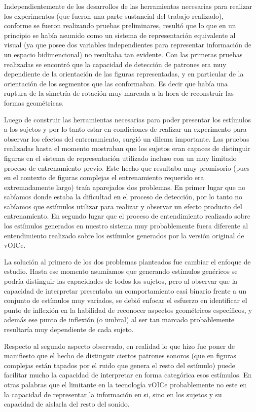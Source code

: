 \documentclass{article}
\numberwithin{figure}{section}
\begin{document}
    Independientemente de los desarrollos de las herramientas necesarias para realizar los experimentos (que fueron una parte sustancial del trabajo realizado), conforme se fueron realizando pruebas preliminares, resultó que lo que en un principio se había asumido como un sistema de representación equivalente al visual (ya que posee dos variables independientes para representar información de un espacio bidimencional) no resultaba tan evidente. Con las primeras pruebas realizadas se encontró que la capacidad de detección de patrones era muy dependiente de la orientación de las figuras representadas, y en particular de la orientación de los segmentos que las conformaban. Es decir que había una ruptura de la simetría de rotación muy marcada a la hora de reconstruir las formas geométricas.
    
    Luego de construir las herramientas necesarias para poder presentar los estímulos a los sujetos y por lo tanto estar en condiciones de realizar un experimento para observar los efectos del entrenamiento, surgió un dilema importante. Las pruebas realizadas hasta el momento mostraban que los sujetos eran capaces de distinguir figuras en el sistema de representación utilizado incluso con un muy limitado proceso de entrenamiento previo. Este hecho que resultaba muy promisorio (pues en el contexto de figuras complejas el entrenamiento requerido era extremadamente largo) traía aparejados dos problemas. En primer lugar que no sabíamos donde estaba la dificultad en el proceso de detección, por lo tanto no sabíamos que estímulos utilizar para realizar y observar un efecto producto del entrenamiento. En segundo lugar que el proceso de entendimiento realizado sobre los estímulos generados en nuestro sistema muy probablemente fuera diferente al entendimiento realizado sobre los estímulos generados por la versión original de vOICe. 
        
    La solución al primero de los dos problemas planteados fue cambiar el enfoque de estudio. Hasta ese momento asumíamos que generando estímulos genéricos se podría distinguir las capacidades de todos los sujetos, pero al observar que la capacidad de interpretar presentaba un comportamiento casi binario frente a un conjunto de estímulos muy variados, se debió enfocar el esfuerzo en identificar el punto de inflexión en la habilidad de reconocer aspectos geométricos específicos, y además ese punto de inflexión (o umbral) al ser tan marcado probablemente resultaría muy dependiente de cada sujeto. 
    
    Respecto al segundo aspecto observado, en realidad lo que hizo fue poner de manifiesto que el hecho de distinguir ciertos patrones sonoros (que en figuras complejas están tapados por el ruido que genera el resto del estímulo) puede facilitar mucho la capacidad de interpretar en forma categórica esos estímulos. En otras palabras que el limitante en la tecnología vOICe probablemente no este en la capacidad de representar la información en si, sino en los sujetos y su capacidad de aislarla del resto del sonido.
    
\end{document}
